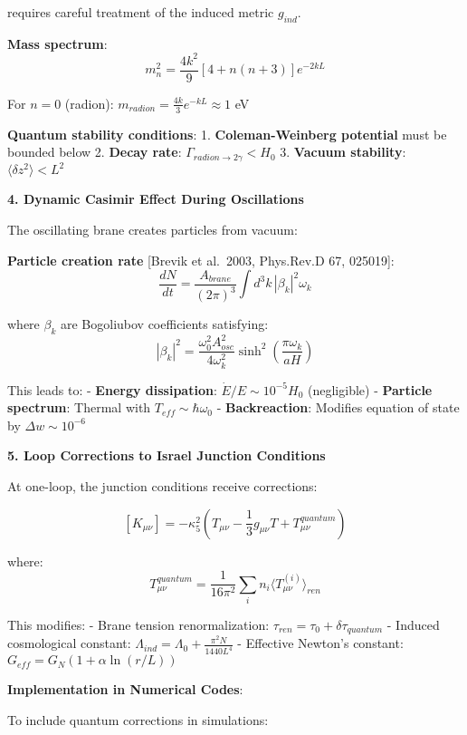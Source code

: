 \documentclass[
  11pt,
]{report}
\begin{document}
requires careful treatment of the induced metric \(g_{ind}\).

\textbf{Mass spectrum}:
\[m_n^2 = \frac{4k^2}{9}\left[4 + n(n+3)\right]e^{-2kL}\]

For \(n=0\) (radion): \(m_{radion} = \frac{4k}{3}e^{-kL} \approx 1\) eV

\textbf{Quantum stability conditions}: 1. \textbf{Coleman-Weinberg
potential} must be bounded below 2. \textbf{Decay rate}:
\(\Gamma_{radion \to 2\gamma} < H_0\) 3. \textbf{Vacuum stability}:
\(\langle\delta z^2\rangle < L^2\)

\textbf{4. Dynamic Casimir Effect During Oscillations}

The oscillating brane creates particles from vacuum:

\textbf{Particle creation rate} {[}Brevik et al.~2003, Phys.Rev.D 67,
025019{]}:
\[\frac{dN}{dt} = \frac{A_{brane}}{(2\pi)^3} \int d^3k \,|β_k|^2 \omega_k\]

where \(\beta_k\) are Bogoliubov coefficients satisfying:
\[|\beta_k|^2 = \frac{\omega_0^2 A_{osc}^2}{4\omega_k^2} \sinh^2\left(\frac{\pi\omega_k}{aH}\right)\]

This leads to: - \textbf{Energy dissipation}:
\(\dot{E}/E \sim 10^{-5} H_0\) (negligible) - \textbf{Particle
spectrum}: Thermal with \(T_{eff} \sim \hbar\omega_0\) -
\textbf{Backreaction}: Modifies equation of state by
\(\Delta w \sim 10^{-6}\)

\textbf{5. Loop Corrections to Israel Junction Conditions}

At one-loop, the junction conditions receive corrections:

\[[K_{\mu\nu}] = -\kappa_5^2\left(T_{\mu\nu} - \frac{1}{3}g_{\mu\nu}T + T_{\mu\nu}^{quantum}\right)\]

where:
\[T_{\mu\nu}^{quantum} = \frac{1}{16\pi^2}\sum_i n_i \langle T_{\mu\nu}^{(i)}\rangle_{ren}\]

This modifies: - Brane tension renormalization:
\(\tau_{ren} = \tau_0 + \delta\tau_{quantum}\) - Induced cosmological
constant: \(\Lambda_{ind} = \Lambda_0 + \frac{\pi^2 N}{1440L^4}\) -
Effective Newton's constant: \(G_{eff} = G_N(1 + \alpha \ln(r/L))\)

\textbf{Implementation in Numerical Codes}:

To include quantum corrections in simulations:
\end{document}
